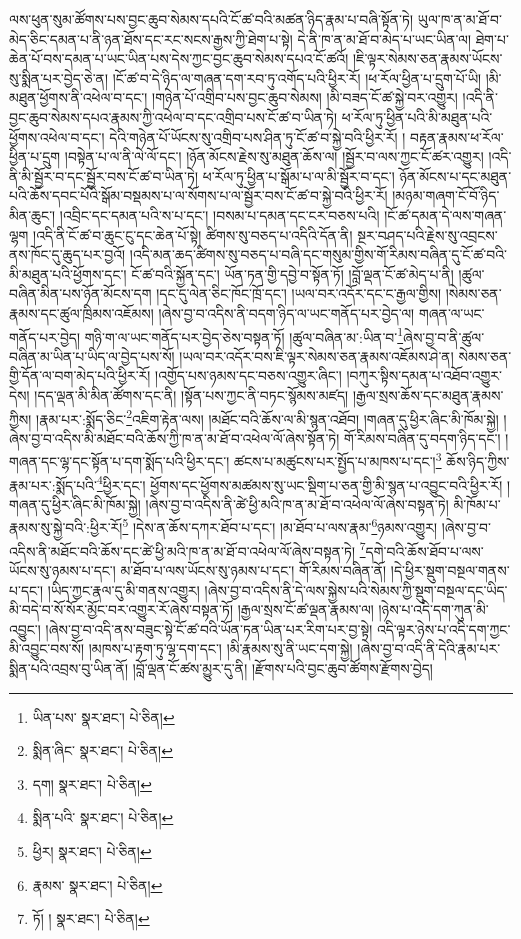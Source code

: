 ལས་ཕུན་སུམ་ཚོགས་པས་བྱང་ཆུབ་སེམས་དཔའི་ངོ་ཚ་བའི་མཚན་ཉིད་རྣམ་པ་བཞི་སྟོན་ཏེ། ཡུལ་ཁ་ན་མ་ཐོ་བ་མེད་ཅིང་དམན་པ་ནི་ཉན་ཐོས་དང་རང་སངས་རྒྱས་ཀྱི་ཐེག་པ་སྟེ། དེ་ནི་ཁ་ན་མ་ཐོ་བ་མེད་པ་ཡང་ཡིན་ལ། ཐེག་པ་ཆེན་པོ་བས་དམན་པ་ཡང་ཡིན་པས་དེས་ཀྱང་བྱང་ཆུབ་སེམས་དཔའ་ངོ་ཚའོ། །ཇི་ལྟར་སེམས་ཅན་རྣམས་ཡོངས་སུ་སྨིན་པར་བྱེད་ཅེ་ན། །ངོ་ཚ་བ་དེ་ཉིད་ལ་གཞན་དག་རབ་ཏུ་འགོད་པའི་ཕྱིར་རོ། །ཕ་རོལ་ཕྱིན་པ་དྲུག་པོ་ཡི། །མི་མཐུན་ཕྱོགས་ནི་འཕེལ་བ་དང་། །གཉེན་པོ་འགྲིབ་པས་བྱང་ཆུབ་སེམས། །མི་བཟད་ངོ་ཚ་སྐྱེ་བར་འགྱུར། །འདི་ནི་བྱང་ཆུབ་སེམས་དཔའ་རྣམས་ཀྱི་འཕེལ་བ་དང་འགྲིབ་པས་ངོ་ཚ་བ་ཡིན་ཏེ། ཕ་རོལ་ཏུ་ཕྱིན་པའི་མི་མཐུན་པའི་ཕྱོགས་འཕེལ་བ་དང་། དེའི་གཉེན་པོ་ཡོངས་སུ་འགྲིབ་པས་ཤིན་ཏུ་ངོ་ཚ་བ་སྐྱེ་བའི་ཕྱིར་རོ། །
བརྟན་རྣམས་ཕ་རོལ་ཕྱིན་པ་དྲུག །བསྟེན་པ་ལ་ནི་ལེ་ལོ་དང་། །ཉོན་མོངས་རྗེས་སུ་མཐུན་ཆོས་ལ། །སྦྱོར་བ་ལས་ཀྱང་ངོ་ཚར་འགྱུར། །འདི་ནི་མི་སྦྱོར་བ་དང་སྦྱོར་བས་ངོ་ཚ་བ་ཡིན་ཏེ། ཕ་རོལ་ཏུ་ཕྱིན་པ་སྒོམ་པ་ལ་མི་སྦྱོར་བ་དང་། ཉོན་མོངས་པ་དང་མཐུན་པའི་ཆོས་དབང་པོའི་སྒོམ་བསྡམས་པ་ལ་སོགས་པ་ལ་སྦྱོར་བས་ངོ་ཚ་བ་སྐྱེ་བའི་ཕྱིར་རོ། །མཉམ་གཞག་ངོ་བོ་ཉིད་མིན་ཆུང་། །འབྲིང་དང་དམན་པའི་ས་པ་དང་། །བསམ་པ་དམན་དང་ངར་བཅས་པའི། །ངོ་ཚ་དམན་དེ་ལས་གཞན་ལྷག །འདི་ནི་ངོ་ཚ་བ་ཆུང་ངུ་དང་ཆེན་པོ་སྟེ། ཚིགས་སུ་བཅད་པ་འདིའི་དོན་ནི། སྔར་བཤད་པའི་རྗེས་སུ་འབྲངས་ནས་ཁོང་དུ་ཆུད་པར་བྱའོ། །འདི་མན་ཆད་ཚིགས་སུ་བཅད་པ་བཞི་དང་གསུམ་གྱིས་གོ་རིམས་བཞིན་དུ་ངོ་ཚ་བའི་མི་མཐུན་པའི་ཕྱོགས་དང་། ངོ་ཚ་བའི་སྐྱོན་དང་། ཡོན་ཏན་གྱི་དབྱེ་བ་སྟོན་ཏོ། །བློ་ལྡན་ངོ་ཚ་མེད་པ་ནི། །ཚུལ་བཞིན་མིན་པས་ཉོན་མོངས་དག །དང་དུ་ལེན་ཅིང་ཁོང་ཁྲོ་དང་། །ཡལ་བར་འདོར་དང་ང་རྒྱལ་གྱིས། །སེམས་ཅན་རྣམས་དང་ཚུལ་ཁྲིམས་འཇོམས། །ཞེས་བྱ་བ་འདིས་ནི་བདག་ཉིད་ལ་ཡང་གནོད་པར་བྱེད་ལ། གཞན་ལ་ཡང་གནོད་པར་བྱེད། གཉི་ག་ལ་ཡང་གནོད་པར་བྱེད་ཅེས་བསྟན་ཏོ། །ཚུལ་བཞིན་མ་:ཡིན་བ་\footnote{ཡིན་པས་  སྣར་ཐང་།  པེ་ཅིན། }ཞེས་བྱ་བ་ནི་ཚུལ་བཞིན་མ་ཡིན་པ་ཡིད་ལ་བྱེད་པས་སོ། །ཡལ་བར་འདོར་བས་ཇི་ལྟར་སེམས་ཅན་རྣམས་འཇོམས་ཤེ་ན། སེམས་ཅན་གྱི་དོན་ལ་བག་མེད་པའི་ཕྱིར་རོ། །འགྱོད་པས་ཉམས་དང་བཅས་འགྱུར་ཞིང་། །བཀུར་སྟིས་དམན་པ་འཐོབ་འགྱུར་དེས། །དད་ལྡན་མི་མིན་ཚོགས་དང་ནི། །སྟོན་པས་ཀྱང་ནི་བཏང་སྙོམས་མཛད། །རྒྱལ་སྲས་ཆོས་དང་མཐུན་རྣམས་ཀྱིས། །རྣམ་པར་:སྨོད་ཅིང་\footnote{སྨིན་ཞིང་  སྣར་ཐང་།  པེ་ཅིན། }འཇིག་རྟེན་ལས། །མཐོང་བའི་ཆོས་ལ་མི་སྙན་འཐོབ། །གཞན་དུ་ཕྱིར་ཞིང་མི་ཁོམ་སྐྱེ། །ཞེས་བྱ་བ་འདིས་མི་མཐོང་བའི་ཆོས་ཀྱི་ཁ་ན་མ་ཐོ་བ་འཕེལ་ལོ་ཞེས་སྟོན་ཏེ། གོ་རིམས་བཞིན་དུ་བདག་ཉིད་དང་། །གཞན་དང་ལྷ་དང་སྟོན་པ་དག་སྨོད་པའི་ཕྱིར་དང་། ཚངས་པ་མཚུངས་པར་སྤྱོད་པ་མཁས་པ་དང་།\footnote{དག།  སྣར་ཐང་།  པེ་ཅིན། } ཆོས་ཉིད་ཀྱིས་རྣམ་པར་:སྨོད་པའི་\footnote{སྨིན་པའི་  སྣར་ཐང་།  པེ་ཅིན། }ཕྱིར་དང་། ཕྱོགས་དང་ཕྱོགས་མཚམས་སུ་ཡང་སྡིག་པ་ཅན་གྱི་མི་སྙན་པ་འབྱུང་བའི་ཕྱིར་རོ། །གཞན་དུ་ཕྱིར་ཞིང་མི་ཁོམ་སྐྱེ། །ཞེས་བྱ་བ་འདིས་ནི་ཚེ་ཕྱི་མའི་ཁ་ན་མ་ཐོ་བ་འཕེལ་ལོ་ཞེས་བསྟན་ཏེ། མི་ཁོམ་པ་རྣམས་སུ་སྐྱེ་བའི་:ཕྱིར་རོ།\footnote{ཕྱིར།  སྣར་ཐང་།  པེ་ཅིན། } །དེས་ན་ཆོས་དཀར་ཐོབ་པ་དང་། །མ་ཐོབ་པ་ལས་རྣམ་\footnote{རྣམས་  སྣར་ཐང་།  པེ་ཅིན། }ཉམས་འགྱུར། །ཞེས་བྱ་བ་འདིས་ནི་མཐོང་བའི་ཆོས་དང་ཚེ་ཕྱི་མའི་ཁ་ན་མ་ཐོ་བ་འཕེལ་ལོ་ཞེས་བསྟན་ཏེ། \footnote{ཏོ། །   སྣར་ཐང་།  པེ་ཅིན། }དགེ་བའི་ཆོས་ཐོབ་པ་ལས་ཡོངས་སུ་ཉམས་པ་དང་། མ་ཐོབ་པ་ལས་ཡོངས་སུ་ཉམས་པ་དང་། གོ་རིམས་བཞིན་ནོ། །དེ་ཕྱིར་སྡུག་བསྔལ་གནས་པ་དང་། །ཡིད་ཀྱང་རྣལ་དུ་མི་གནས་འགྱུར། །ཞེས་བྱ་བ་འདིས་ནི་དེ་ལས་སྐྱེས་པའི་སེམས་ཀྱི་སྡུག་བསྔལ་དང་ཡིད་མི་བདེ་བ་སོ་སོར་མྱོང་བར་འགྱུར་རོ་ཞེས་བསྟན་ཏོ། །རྒྱལ་སྲས་ངོ་ཚ་ལྡན་རྣམས་ལ། །ཉེས་པ་འདི་དག་ཀུན་མི་འབྱུང་། །ཞེས་བྱ་བ་འདི་ནས་བཟུང་སྟེ་ངོ་ཚ་བའི་ཡོན་ཏན་ཡིན་པར་རིག་པར་བྱ་སྟེ། འདི་ལྟར་ཉེས་པ་འདི་དག་ཀྱང་མི་འབྱུང་བས་སོ། །མཁས་པ་རྟག་ཏུ་ལྷ་དག་དང་། །མི་རྣམས་སུ་ནི་ཡང་དག་སྐྱེ། །ཞེས་བྱ་བ་འདི་ནི་དེའི་རྣམ་པར་སྨིན་པའི་འབྲས་བུ་ཡིན་ནོ། །བློ་ལྡན་ངོ་ཚས་མྱུར་དུ་ནི། །རྫོགས་པའི་བྱང་ཆུབ་ཚོགས་རྫོགས་བྱེད། 